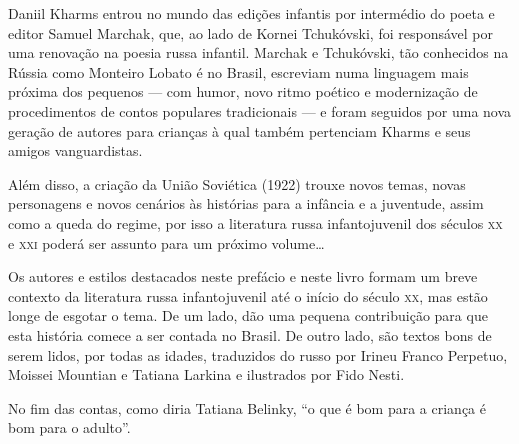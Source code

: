 Daniil Kharms entrou no mundo das edições infantis por intermédio do
poeta e editor Samuel Marchak, que, ao lado de Kornei
Tchukóvski, foi responsável por uma renovação na poesia
russa infantil. Marchak e Tchukóvski, tão conhecidos na Rússia como
Monteiro Lobato é no Brasil, escreviam numa linguagem mais próxima dos
pequenos --- com humor, novo ritmo poético e modernização de
procedimentos de contos populares tradicionais --- e foram seguidos por
uma nova geração de autores para crianças à qual também pertenciam
Kharms e seus amigos vanguardistas.

Além disso, a criação da União Soviética (1922) trouxe novos temas,
novas personagens e novos cenários às histórias para a infância e a
juventude, assim como a queda do regime, por isso a literatura russa
infantojuvenil dos séculos \textsc{xx} e \textsc{xxi} poderá ser assunto para um próximo
volume\ldots{}

Os autores e estilos destacados neste prefácio e neste livro formam um
breve contexto da literatura russa infantojuvenil até o início do século
\textsc{xx}, mas estão longe de esgotar o tema. De um lado, dão uma pequena
contribuição para que esta história comece a ser contada no Brasil. De
outro lado, são textos bons de serem lidos, por todas as idades,
traduzidos do russo por Irineu Franco Perpetuo, Moissei Mountian e
Tatiana Larkina e ilustrados por Fido Nesti.

No fim das contas, como diria Tatiana Belinky, ``o que é bom para a
criança é bom para o adulto''.

\endgroup
